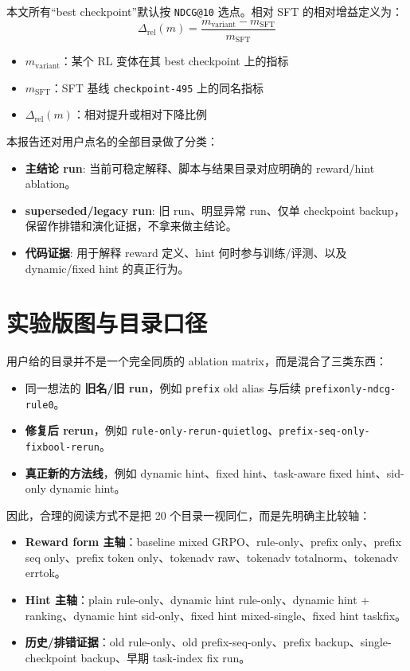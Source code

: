 \documentclass[a4paper]{article}
\begin{document}
本文所有“best checkpoint”默认按 \texttt{NDCG@10} 选点。相对 SFT 的相对增益定义为：
$$
\Delta_{\mathrm{rel}}(m)=\frac{m_{\mathrm{variant}}-m_{\mathrm{SFT}}}{m_{\mathrm{SFT}}}
$$
\begin{itemize}
\item $m_{\mathrm{variant}}$：某个 RL 变体在其 best checkpoint 上的指标
\item $m_{\mathrm{SFT}}$：SFT 基线 \texttt{checkpoint-495} 上的同名指标
\item $\Delta_{\mathrm{rel}}(m)$：相对提升或相对下降比例
\end{itemize}

本报告还对用户点名的全部目录做了分类：
\begin{itemize}
\item \textbf{主结论 run}: 当前可稳定解释、脚本与结果目录对应明确的 reward/hint ablation。
\item \textbf{superseded/legacy run}: 旧 run、明显异常 run、仅单 checkpoint backup，保留作排错和演化证据，不拿来做主结论。
\item \textbf{代码证据}: 用于解释 reward 定义、hint 何时参与训练/评测、以及 dynamic/fixed hint 的真正行为。
\end{itemize}

\section{实验版图与目录口径}

用户给的目录并不是一个完全同质的 ablation matrix，而是混合了三类东西：
\begin{itemize}
\item 同一想法的 \textbf{旧名/旧 run}，例如 \texttt{prefix} old alias 与后续 \texttt{prefixonly-ndcg-rule0}。
\item \textbf{修复后 rerun}，例如 \texttt{rule-only-rerun-quietlog}、\texttt{prefix-seq-only-fixbool-rerun}。
\item \textbf{真正新的方法线}，例如 dynamic hint、fixed hint、task-aware fixed hint、sid-only dynamic hint。
\end{itemize}

因此，合理的阅读方式不是把 20 个目录一视同仁，而是先明确主比较轴：
\begin{itemize}
\item \textbf{Reward form 主轴}：baseline mixed GRPO、rule-only、prefix only、prefix seq only、prefix token only、tokenadv raw、tokenadv totalnorm、tokenadv errtok。
\item \textbf{Hint 主轴}：plain rule-only、dynamic hint rule-only、dynamic hint + ranking、dynamic hint sid-only、fixed hint mixed-single、fixed hint taskfix。
\item \textbf{历史/排错证据}：old rule-only、old prefix-seq-only、prefix backup、single-checkpoint backup、早期 task-index fix run。
\end{itemize}
\end{document}
